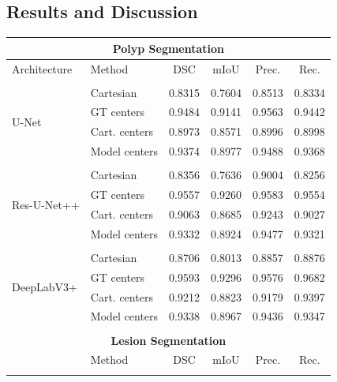   \subsection{Results and Discussion}


\begin{table}
\centering
\def\arraystretch{1.2}
\begin{tabularx}{\textwidth}{X X c c c c} 
 \\ [-2ex]

 \multicolumn{6}{c}{\textbf{Polyp Segmentation}}\\[1ex]
 \hline
 Architecture & Method & DSC & mIoU & Prec. & Rec. \\ 
 \hline \\ [-1.5ex]
 
 \multirow{4}{7em}{{U-Net}}
& Cartesian & 0.8315 & 0.7604 & 0.8513 & 0.8334 \\
& GT centers & 0.9484 & 0.9141 & 0.9563 & 0.9442 \\
& Cart. centers & 0.8973 & 0.8571 & 0.8996 & 0.8998 \\
& Model centers & 0.9374 & 0.8977 & 0.9488 & 0.9368 \\ [1ex]
\hline \\ [-1.5ex]

 \multirow{4}{7em}{{Res-U-Net++}}
& Cartesian & 0.8356 & 0.7636 & 0.9004 & 0.8256 \\
& GT centers & 0.9557 & 0.9260 & 0.9583 & 0.9554 \\
& Cart. centers & 0.9063 & 0.8685 & 0.9243 & 0.9027 \\
& Model centers & 0.9332 & 0.8924 & 0.9477 & 0.9321 \\ [1ex]
\hline \\ [-1.5ex]

 \multirow{4}{7em}{{DeepLabV3+}}
& Cartesian & 0.8706 & 0.8013 & 0.8857 & 0.8876 \\
& GT centers & 0.9593 & 0.9296 & 0.9576 & 0.9682 \\
& Cart. centers & 0.9212 & 0.8823 & 0.9179 & 0.9397 \\
& Model centers & 0.9338 & 0.8967 & 0.9436 & 0.9347 \\ [1ex]
\hline \\ [-1.5ex]

\multicolumn{6}{c}{\textbf{Lesion Segmentation}}\\[1ex]
 \hline
  & Method & DSC & mIoU & Prec. & Rec. \\ 
 \hline \\ [-1.5ex]
 

\end{tabularx}
\end{table}
